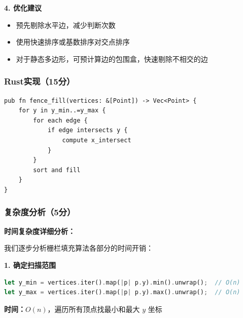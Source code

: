 ﻿\documentclass[12pt,a4paper]{article}
\begin{document}
\begin{tcolorbox}[breakable]
\textbf{4. 优化建议}

\begin{itemize}
\item 预先剔除水平边，减少判断次数
\item 使用快速排序或基数排序对交点排序
\item 对于静态多边形，可预计算边的包围盒，快速剔除不相交的边
\end{itemize}
\end{tcolorbox}

\subsubsection{Rust实现（15分）}

\begin{lstlisting}
pub fn fence_fill(vertices: &[Point]) -> Vec<Point> {
    for y in y_min..=y_max {
        for each edge {
            if edge intersects y {
                compute x_intersect
            }
        }
        sort and fill
    }
}
\end{lstlisting}

\subsubsection{复杂度分析（5分）}

\textbf{时间复杂度详细分析：}

我们逐步分析栅栏填充算法各部分的时间开销：

\textbf{1. 确定扫描范围}
\begin{lstlisting}[language=Rust, numbers=none]
let y_min = vertices.iter().map(|p| p.y).min().unwrap();  // O(n)
let y_max = vertices.iter().map(|p| p.y).max().unwrap();  // O(n)
\end{lstlisting}
\textbf{时间：}$O(n)$，遍历所有顶点找最小和最大 $y$ 坐标
\end{document}
